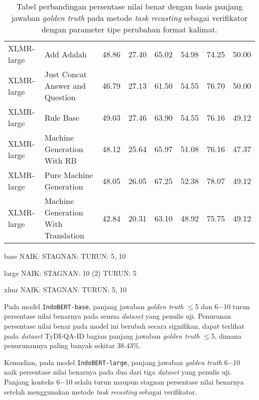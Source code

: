 \begin{table}[H]
\begin{tabular}{llrrrrrr}
    XLMR-large &                          Add Adalah &                48.86 &                 27.40 &                65.02 &                 54.98 &                74.25 &                 50.00 \\
    XLMR-large &     Just Concat Answer and Question &                46.79 &                 27.13 &                61.50 &                 54.55 &                76.70 &                 50.00 \\
    XLMR-large &                           Rule Base &                49.03 &                 27.46 &                63.90 &                 54.55 &                76.16 &                 49.12 \\
    XLMR-large &          Machine Generation With RB &                48.12 &                 25.64 &                65.97 &                 51.08 &                76.16 &                 47.37 \\
    XLMR-large &             Pure Machine Generation &                48.05 &                 26.05 &                67.25 &                 52.38 &                78.07 &                 49.12 \\
    XLMR-large & Machine Generation With Translation &                42.84 &                 20.31 &                63.10 &                 48.92 &                75.75 &                 49.12 \\
\bottomrule
\end{tabular}
\caption{Tabel perbandingan persentase nilai benar dengan basis panjang jawaban \emph{golden truth} pada metode \emph{task recasting} sebagai verifikator dengan parameter tipe perubahan format kalimat.}
\end{table}

base
NAIK:
STAGNAN:
TURUN: 5, 10

large
NAIK:
STAGNAN: 10 (2)
TURUN: 5

xlmr
NAIK:
STAGNAN:  
TURUN: 5, 10

Pada model \texttt{IndoBERT-base}, panjang jawaban \emph{golden truth} $\leq$5 dan 6$-$10 turun persentase nilai benarnya pada semua \emph{dataset} yang penulis uji. Penurunan persentase nilai benar pada model ini berubah secara signifikan, dapat terlihat pada \emph{dataset} TyDI-QA-ID bagian panjang jawaban \emph{golden truth} $\leq$5, dimana penurunannya paling banyak sekitar 38.43\%.

Kemudian, pada model \texttt{IndoBERT-large}, panjang jawaban \emph{golden truth} 6$-$10 naik persentase nilai benarnya pada dua dari tiga \emph{dataset} yang penulis uji. Panjang konteks  6$-$10 selalu turun maupun stagnan persentase nilai benarnya setelah menggunakan metode \emph{task recasting} sebagai verifikator.

